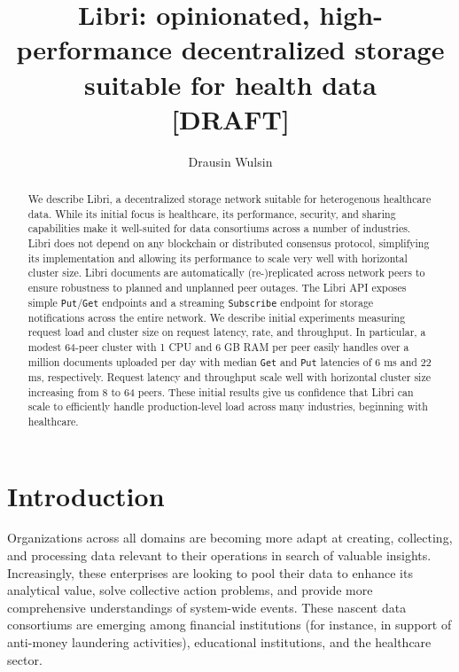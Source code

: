 \documentclass[10pt]{article}
\newcommand{\ttt}[1]{\texttt{#1}}
\def\Put{\ttt{Put}}
\def\Get{\ttt{Get}}
\begin{document}
\title{Libri: opinionated, high-performance decentralized storage suitable for health data \\ \vspace{5mm} \Large [DRAFT]}
\author{Drausin Wulsin}
\maketitle

\begin{abstract}
We describe Libri, a decentralized storage network suitable for heterogenous healthcare data. While its initial focus is healthcare, its performance, security, and sharing capabilities make it well-suited for data consortiums across a number of industries. Libri does not depend on any blockchain or distributed consensus protocol, simplifying its implementation and allowing its performance to scale very well with horizontal cluster size. Libri documents are automatically (re-)replicated across network peers to ensure robustness to planned and unplanned peer outages. The Libri API exposes simple \Put{}/\Get{} endpoints and a streaming \ttt{Subscribe} endpoint for storage notifications across the entire network. We describe initial experiments measuring request load and cluster size on request latency, rate, and throughput. In particular, a modest 64-peer cluster with 1 CPU and 6 GB RAM per peer easily handles over a million documents uploaded per day with median \Get{} and \Put{} latencies of 6 ms and 22 ms, respectively. Request latency and throughput scale well with horizontal cluster size increasing from 8 to 64 peers. These initial results give us confidence that Libri can scale to efficiently handle production-level load across many industries, beginning with healthcare.
\end{abstract}

\section{Introduction}
Organizations across all domains are becoming more adapt at creating, collecting, and processing data relevant to their operations in search of valuable insights. Increasingly, these enterprises are looking to pool their data to enhance its analytical value, solve collective action problems, and provide more comprehensive understandings of system-wide events. These nascent data consortiums are emerging among financial institutions (for instance, in support of anti-money laundering activities), educational institutions, and the healthcare sector.
\end{document}
